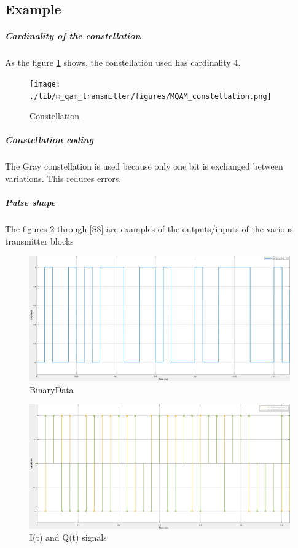 \subsection*{Example}
\subparagraph*{Cardinality of the constellation}
As the figure \ref{constellation} shows, the constellation used has cardinality 4.

\begin{figure}[hbtp]
\centering
\texttt{[image: ./lib/m\_qam\_transmitter/figures/MQAM\_constellation.png]}
\caption{Constellation}\label{constellation}
\end{figure}

\subparagraph*{Constellation coding}
The Gray constellation is used because only one bit is exchanged between variations. This reduces errors.
\subparagraph*{Pulse shape}
The figures \ref{S0} through \ref{S8} are examples of the outputs/inputs of the various transmitter blocks
\begin{figure}[H]
\centering
\includegraphics[scale=0.35]{./lib/m_qam_transmitter/figures/S0.PNG}
\caption{BinaryData}\label{S0}
\end{figure}

\begin{figure}[H]
\centering
\includegraphics[scale=0.35]{./lib/m_qam_transmitter/figures/S1_S2.PNG}
\caption{I(t) and Q(t) signals}\label{S1_S2}
\end{figure}

